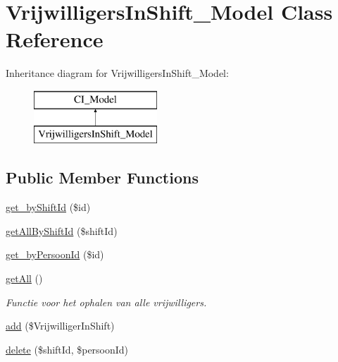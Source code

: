 \hypertarget{class_vrijwilligers_in_shift___model}{}\section{Vrijwilligers\+In\+Shift\+\_\+\+Model Class Reference}
\label{class_vrijwilligers_in_shift___model}
Inheritance diagram for Vrijwilligers\+In\+Shift\+\_\+\+Model\+:\begin{figure}[H]
\begin{center}
\leavevmode
\includegraphics[height=2.000000cm]{class_vrijwilligers_in_shift___model}
\end{center}
\end{figure}
\subsection*{Public Member Functions}
\begin{DoxyCompactItemize}
\item 
\mbox{\hyperlink{class_vrijwilligers_in_shift___model_ac7afbe51273364c55dd352b3c9554592}{get\+\_\+by\+Shift\+Id}} (\$id)
\item 
\mbox{\hyperlink{class_vrijwilligers_in_shift___model_a8a9b3e545063a3b69d118ac1109b3da4}{get\+All\+By\+Shift\+Id}} (\$shift\+Id)
\item 
\mbox{\hyperlink{class_vrijwilligers_in_shift___model_aae12e5673029c5081662fa51503c4413}{get\+\_\+by\+Persoon\+Id}} (\$id)
\item 
\mbox{\label{class_vrijwilligers_in_shift___model_a8323f4be7e1a03445c0b6c46ede8d35c}} 
\mbox{\hyperlink{class_vrijwilligers_in_shift___model_a8323f4be7e1a03445c0b6c46ede8d35c}{get\+All}} ()
\begin{DoxyCompactList}\small\item\em Functie voor het ophalen van alle vrijwilligers. \end{DoxyCompactList}\item 
\mbox{\hyperlink{class_vrijwilligers_in_shift___model_ace0abb83991ff90729515c3e86c0a3ac}{add}} (\$Vrijwilliger\+In\+Shift)
\item 
\mbox{\hyperlink{class_vrijwilligers_in_shift___model_a62d1d1920e3c5a73f117ad9293260d67}{delete}} (\$shift\+Id, \$persoon\+Id)
\end{DoxyCompactItemize}


